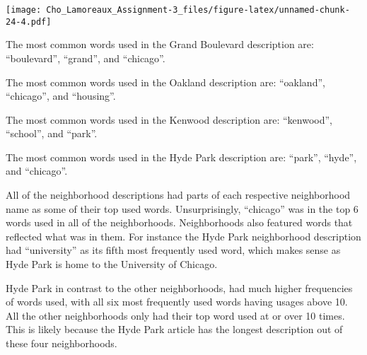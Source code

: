 \documentclass[
]{article}
\begin{document}
\texttt{[image: Cho\_Lamoreaux\_Assignment-3\_files/figure-latex/unnamed-chunk-24-4.pdf]}

The most common words used in the Grand Boulevard description are:
``boulevard'', ``grand'', and ``chicago''.

The most common words used in the Oakland description are: ``oakland'',
``chicago'', and ``housing''.

The most common words used in the Kenwood description are: ``kenwood'',
``school'', and ``park''.

The most common words used in the Hyde Park description are: ``park'',
``hyde'', and ``chicago''.

All of the neighborhood descriptions had parts of each respective
neighborhood name as some of their top used words. Unsurprisingly,
``chicago'' was in the top 6 words used in all of the neighborhoods.
Neighborhoods also featured words that reflected what was in them. For
instance the Hyde Park neighborhood description had ``university'' as
its fifth most frequently used word, which makes sense as Hyde Park is
home to the University of Chicago.

Hyde Park in contrast to the other neighborhoods, had much higher
frequencies of words used, with all six most frequently used words
having usages above 10. All the other neighborhoods only had their top
word used at or over 10 times. This is likely because the Hyde Park
article has the longest description out of these four neighborhoods.
\end{document}
